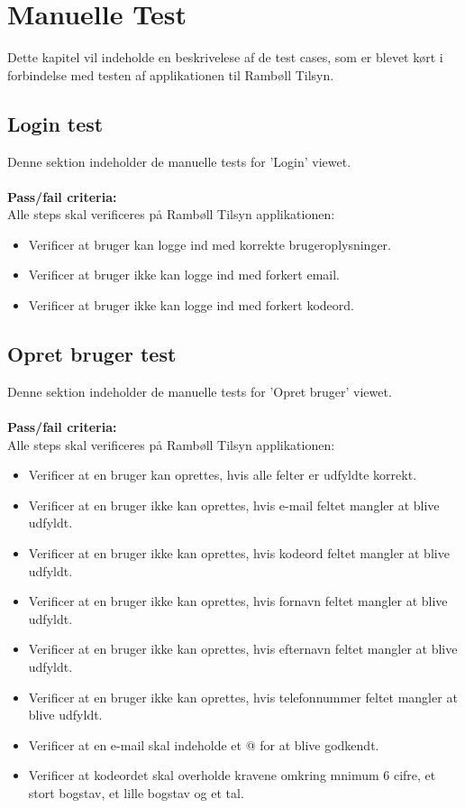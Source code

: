 \chapter{Manuelle Test} \label{sec:ManuelTest}
Dette kapitel vil indeholde en beskrivelese af de test cases, som er blevet kørt i forbindelse med testen af applikationen til Rambøll Tilsyn.

\section{Login test}
Denne sektion indeholder de manuelle tests for 'Login' viewet. \\ \\
\textbf{Pass/fail criteria:} \\
Alle steps skal verificeres på Rambøll Tilsyn applikationen:
\begin{itemize}[-]
	\item Verificer at bruger kan logge ind med korrekte brugeroplysninger.
	\item Verificer at bruger ikke kan logge ind med forkert email.
	\item Verificer at bruger ikke kan logge ind med forkert kodeord. \\
\end{itemize}

\section{Opret bruger test}
Denne sektion indeholder de manuelle tests for 'Opret bruger' viewet. \\ \\
\textbf{Pass/fail criteria:} \\
Alle steps skal verificeres på Rambøll Tilsyn applikationen:
\begin{itemize}[-]
	\item Verificer at en bruger kan oprettes, hvis alle felter er udfyldte korrekt.
	\item Verificer at en bruger ikke kan oprettes, hvis e-mail feltet mangler at blive udfyldt.
	\item Verificer at en bruger ikke kan oprettes, hvis kodeord feltet mangler at blive udfyldt.
	\item Verificer at en bruger ikke kan oprettes, hvis fornavn feltet mangler at blive udfyldt.
	\item Verificer at en bruger ikke kan oprettes, hvis efternavn feltet mangler at blive udfyldt.
	\item Verificer at en bruger ikke kan oprettes, hvis telefonnummer feltet mangler at blive udfyldt.
	\item Verificer at en e-mail skal indeholde et @ for at blive godkendt.
	\item Verificer at kodeordet skal overholde kravene omkring mnimum 6 cifre, et stort bogstav, et lille bogstav og et tal.
\end{itemize}

